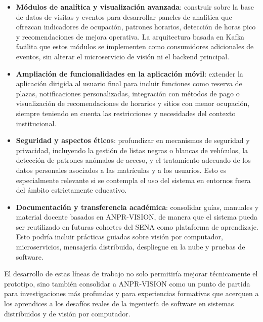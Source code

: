 \begin{itemize}
    \item \textbf{Módulos de analítica y visualización avanzada}: construir sobre la base de datos de visitas y eventos para desarrollar paneles de analítica que ofrezcan indicadores de ocupación, patrones horarios, detección de horas pico y recomendaciones de mejora operativa. La arquitectura basada en Kafka facilita que estos módulos se implementen como consumidores adicionales de eventos, sin alterar el microservicio de visión ni el backend principal.
    
    \item \textbf{Ampliación de funcionalidades en la aplicación móvil}: extender la aplicación dirigida al usuario final para incluir funciones como reserva de plazas, notificaciones personalizadas, integración con métodos de pago o visualización de recomendaciones de horarios y sitios con menor ocupación, siempre teniendo en cuenta las restricciones y necesidades del contexto institucional.
    
    \item \textbf{Seguridad y aspectos éticos}: profundizar en mecanismos de seguridad y privacidad, incluyendo la gestión de listas negras o blancas de vehículos, la detección de patrones anómalos de acceso, y el tratamiento adecuado de los datos personales asociados a las matrículas y a los usuarios. Esto es especialmente relevante si se contempla el uso del sistema en entornos fuera del ámbito estrictamente educativo.
    
    \item \textbf{Documentación y transferencia académica}: consolidar guías, manuales y material docente basados en ANPR-VISION, de manera que el sistema pueda ser reutilizado en futuras cohortes del SENA como plataforma de aprendizaje. Esto podría incluir prácticas guiadas sobre visión por computador, microservicios, mensajería distribuida, despliegue en la nube y pruebas de software.
\end{itemize}

El desarrollo de estas líneas de trabajo no solo permitiría mejorar técnicamente el prototipo, sino también consolidar a ANPR-VISION como un punto de partida para investigaciones más profundas y para experiencias formativas que acerquen a los aprendices a los desafíos reales de la ingeniería de software en sistemas distribuidos y de visión por computador.
